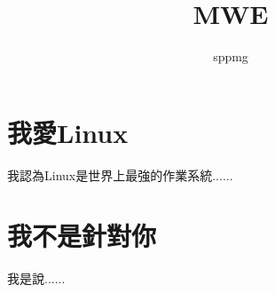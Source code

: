 \documentclass[12pt,a4paper]{book}
\author{sppmg}
\title{MWE}
\begin{document}
    \frontmatter
        \maketitle
        \tableofcontents        %
        \listoffigures         %
        \listoftables           %
    \mainmatter
        \chapter{我愛Linux}
            我認為Linux是世界上最強的作業系統......
    \appendix
        \chapter{我不是針對你}
            我是說......
    \backmatter
\end{document}
